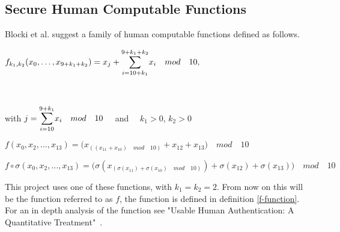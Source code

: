 \subsection{Secure Human Computable Functions}\label{secfuncs}
Blocki et al. \cite{hcp-blocki} suggest a family of human computable functions defined as follows.
\centerline{ $ f_{k_1,k_2}(x_0,\dots,x_{9+k_1+k_2})= x_j + \mathlarger{\sum}\limits^{9+k_1+k_2}_{i=10+k_1} x_i \quad mod\quad 10,$}\\
\centerline{with $j = \mathlarger{\sum}\limits^{9+k_1}_{i=10} x_i \quad mod \quad 10\quad$ and $\quad k_1>0$, $k_2>0$ }
\vspace{2mm}


\begin{definition}
    \label{f-function}
    $f(x_0,x_2,\dots,x_{13}) = \big( x_{(( x_{11} + x_{10} )\quad mod \quad 10)} + x_{12} + x_{13} \big)\quad mod \quad 10$ 
\end{definition} 

\begin{definition}
    \label{fo-function}
    $f\circ \sigma(x_0,x_2,\dots,x_{13}) = \big(\sigma ( x_{(\sigma(x_{11}) + \sigma(x_{10})\quad mod \quad 10)} ) +\sigma ( x_{12} ) + \sigma( x_{13} )\big)\quad mod \quad 10$ 
\end{definition}

\par This project uses one of these functions, with $k_1=k_2=2$. From now on this will be the function referred to as $f$, the function is defined in definition \ref{f-function}. For an in depth analysis of the function see "Usable Human Authentication: A Quantitative Treatment"~\cite{Blocki2014}. 

